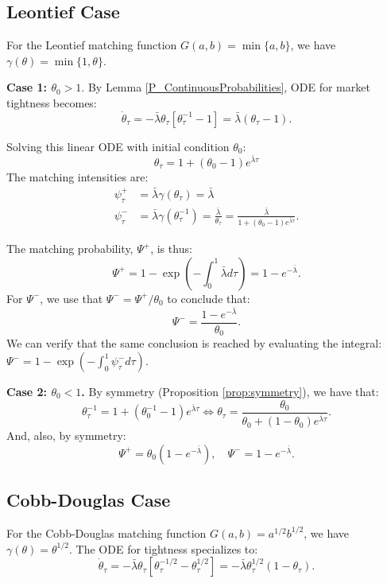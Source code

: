 \subsection{Leontief Case}

For the Leontief matching function $G(a,b) = \min\{a,b\}$, we have $\gamma(\theta) = \min\{1,\theta\}$.

\textbf{Case 1: $\theta_0 > 1$}. By Lemma \ref{P_ContinuousProbabilities}, ODE for market tightness becomes:
\[
\dot{\theta}_{\tau} = -\bar{\lambda}\theta_{\tau}[\theta_{\tau}^{-1} - 1] = \bar{\lambda}(\theta_{\tau} - 1).
\]

Solving this linear ODE with initial condition $\theta_0$:
\[
\theta_{\tau} = 1 + (\theta_0 - 1)e^{\bar{\lambda}\tau}
\]
The matching intensities are:
\begin{align*}
\psi^+_{\tau} &= \bar{\lambda}\gamma(\theta_{\tau}) = \bar{\lambda}\\
\psi^-_{\tau} &= \bar{\lambda}\gamma(\theta_{\tau}^{-1}) = \frac{\bar{\lambda}}{\theta_{\tau}} = \frac{\bar{\lambda}}{1 + (\theta_0 - 1)e^{\bar{\lambda}\tau}}.
\end{align*}

The matching probability, $\Psi^+$, is thus:
\[
\Psi^+ = 1 - \exp\left(-\int_0^1 \bar{\lambda}d\tau\right) = 1 - e^{-\bar{\lambda}}.
\]
For $\Psi^-$, we use that $\Psi^-=\Psi^+/\theta_0$ to conclude that:
\[
\Psi^-= \frac{1 - e^{-\bar{\lambda}}}{\theta_0}.
\]
We can verify that the same conclusion is reached by evaluating the integral: $\Psi^-=1-\exp(-\int^1_0\psi^{-}_\tau d\tau).$ 

\textbf{Case 2: $\theta_0 < 1$.} By symmetry (Proposition \ref{prop:symmetry}), we have that:
\[
\theta_{\tau}^{-1} = 1+(\theta_{0}^{-1}-1)e^{\bar{\lambda}\tau} \Leftrightarrow
\theta_{\tau}= \frac{\theta_0}{\theta_0 + (1-\theta_0)e^{\bar{\lambda}\tau}}.
\]
And, also, by symmetry:
\[
\Psi^+ = \theta_0(1-e^{-\bar{\lambda}}), \quad \Psi^- = 1-e^{-\bar{\lambda}}.
\]

\subsection{Cobb-Douglas Case}

For the Cobb-Douglas matching function $G(a,b) = a^{1/2}b^{1/2}$, we have $\gamma(\theta) = \theta^{1/2}$. The ODE for tightness specializes to:
\[
\dot{\theta}_{\tau} = -\bar{\lambda}\theta_{\tau}[\theta_{\tau}^{-1/2} - \theta_{\tau}^{1/2}] = -\bar{\lambda}\theta_{\tau}^{1/2}(1 - \theta_{\tau}).
\]

